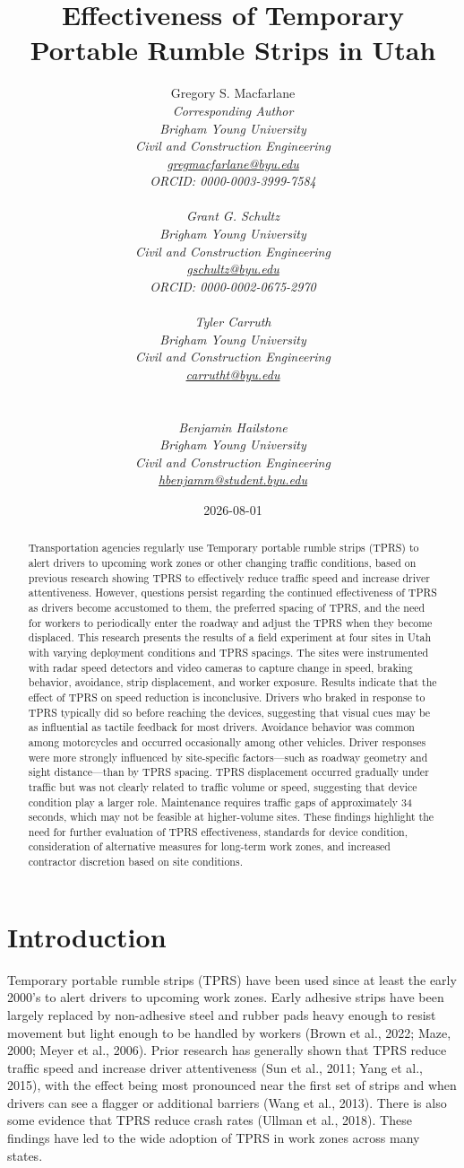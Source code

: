 \documentclass[
  letterpaper,
]{trb}
\title{Effectiveness of Temporary Portable Rumble Strips in Utah}
\author{
Gregory S. Macfarlane\\ \itshape{Corresponding Author} \\Brigham Young
University\\Civil and Construction
Engineering\\\href{mailto:gregmacfarlane@byu.edu}{gregmacfarlane@byu.edu}\\ORCID: 0000-0003-3999-7584\\ \\ 
Grant G. Schultz\\Brigham Young University\\Civil and Construction
Engineering\\\href{mailto:gschultz@byu.edu}{gschultz@byu.edu}\\ORCID: 0000-0002-0675-2970\\ \\ 
Tyler Carruth\\Brigham Young University\\Civil and Construction
Engineering\\\href{mailto:carrutht@byu.edu}{carrutht@byu.edu}\\\\ \\ 
Benjamin Hailstone\\Brigham Young University\\Civil and Construction
Engineering\\\href{mailto:hbenjamm@student.byu.edu}{hbenjamm@student.byu.edu}\\}
\date{2026-08-01}
\begin{document}
\maketitle
\newpage
\begin{abstract}
Transportation agencies regularly use Temporary portable rumble strips
(TPRS) to alert drivers to upcoming work zones or other changing traffic
conditions, based on previous research showing TPRS to effectively
reduce traffic speed and increase driver attentiveness. However,
questions persist regarding the continued effectiveness of TPRS as
drivers become accustomed to them, the preferred spacing of TPRS, and
the need for workers to periodically enter the roadway and adjust the
TPRS when they become displaced. This research presents the results of a
field experiment at four sites in Utah with varying deployment
conditions and TPRS spacings. The sites were instrumented with radar
speed detectors and video cameras to capture change in speed, braking
behavior, avoidance, strip displacement, and worker exposure. Results
indicate that the effect of TPRS on speed reduction is inconclusive.
Drivers who braked in response to TPRS typically did so before reaching
the devices, suggesting that visual cues may be as influential as
tactile feedback for most drivers. Avoidance behavior was common among
motorcycles and occurred occasionally among other vehicles. Driver
responses were more strongly influenced by site-specific factors---such
as roadway geometry and sight distance---than by TPRS spacing. TPRS
displacement occurred gradually under traffic but was not clearly
related to traffic volume or speed, suggesting that device condition
play a larger role. Maintenance requires traffic gaps of approximately
34 seconds, which may not be feasible at higher-volume sites. These
findings highlight the need for further evaluation of TPRS
effectiveness, standards for device condition, consideration of
alternative measures for long-term work zones, and increased contractor
discretion based on site conditions.
\end{abstract}
\newpage



\section{Introduction}\label{sec-intro}

Temporary portable rumble strips (TPRS) have been used since at least
the early 2000's to alert drivers to upcoming work zones. Early adhesive
strips have been largely replaced by non-adhesive steel and rubber pads
heavy enough to resist movement but light enough to be handled by
workers (Brown et al., 2022; Maze, 2000; Meyer et al., 2006). Prior
research has generally shown that TPRS reduce traffic speed and increase
driver attentiveness (Sun et al., 2011; Yang et al., 2015), with the
effect being most pronounced near the first set of strips and when
drivers can see a flagger or additional barriers (Wang et al., 2013).
There is also some evidence that TPRS reduce crash rates (Ullman et al.,
2018). These findings have led to the wide adoption of TPRS in work
zones across many states.
\end{document}
